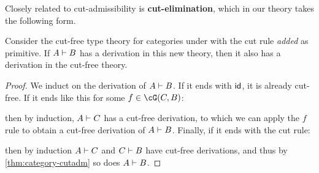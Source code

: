 Closely related to cut-admissibility is \textbf{cut-elimination}, which in our theory takes the following form.

\begin{thm}\label{thm:category-cutelim}
  Consider the cut-free type theory for categories under \cG with the cut rule \emph{added} as primitive.
  If $A\types B$ has a derivation in this new theory, then it also has a derivation in the cut-free theory.
\end{thm}
\begin{proof}
  We induct on the derivation of $A\types B$.
  If it ends with $\idfunc$, it is already cut-free.
  If it ends like this for some $f\in\cG(C,B)$:
  \begin{mathpar}
  \end{mathpar}
  then by induction, $A\types C$ has a cut-free derivation, to which we can apply the $f$ rule to obtain a cut-free derivation of $A\types B$.
  Finally, if it ends with the cut rule:
  \begin{mathpar}
  \end{mathpar}
  then by induction $A\types C$ and $C\types B$ have cut-free derivations, and thus by \cref{thm:category-cutadm} so does $A\types B$.
\end{proof}

